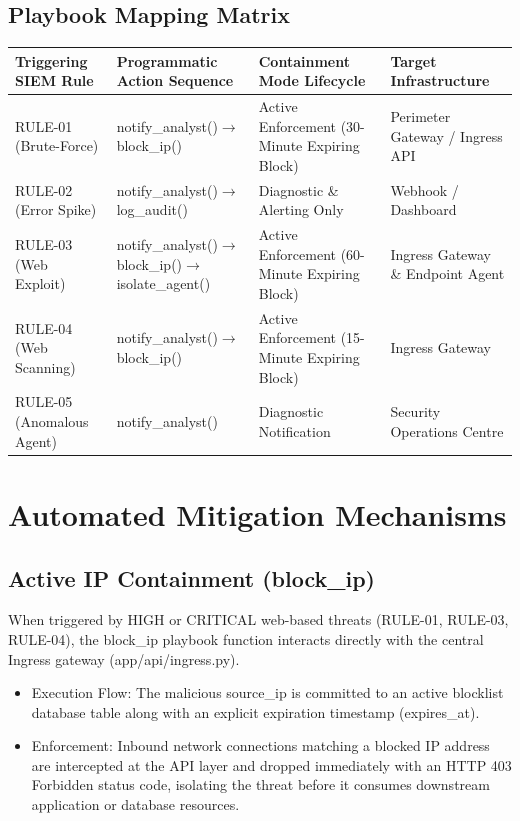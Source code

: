 \subsection{Playbook Mapping Matrix}

\begin{table}[htbp]
\centering
\begin{tabular}{|P{3cm}|P{5cm}|P{5cm}|P{5cm}|}
\hline
Triggering SIEM Rule & Programmatic Action Sequence & Containment Mode Lifecycle & Target Infrastructure \\ \hline
RULE-01 (Brute-Force) & notify\_analyst()$\rightarrow$block\_ip() & Active Enforcement (30-Minute Expiring Block) & Perimeter Gateway / Ingress API \\ \hline
RULE-02 (Error Spike) & notify\_analyst()$\rightarrow$log\_audit() & Diagnostic \& Alerting Only & Webhook / Dashboard \\ \hline
RULE-03 (Web Exploit) & notify\_analyst()$\rightarrow$block\_ip()$\rightarrow$ isolate\_agent() & Active Enforcement (60-Minute Expiring Block) & Ingress Gateway \& Endpoint Agent \\ \hline
RULE-04 (Web Scanning) & notify\_analyst()$\rightarrow$block\_ip() & Active Enforcement (15-Minute Expiring Block) & Ingress Gateway \\ \hline
RULE-05 (Anomalous Agent) & notify\_analyst() & Diagnostic Notification & Security Operations Centre \\ \hline
\end{tabular}
\end{table}

\section{Automated Mitigation Mechanisms}

\subsection{Active IP Containment (block\_ip)}

When triggered by HIGH or CRITICAL web-based threats (RULE-01, RULE-03, RULE-04), the block\_ip playbook function interacts directly with the central Ingress gateway (app/api/ingress.py).

\begin{itemize}
  \item Execution Flow: The malicious source\_ip is committed to an active blocklist database table along with an explicit expiration timestamp (expires\_at).
  \item Enforcement: Inbound network connections matching a blocked IP address are intercepted at the API layer and dropped immediately with an HTTP 403 Forbidden status code, isolating the threat before it consumes downstream application or database resources.
\end{itemize}

